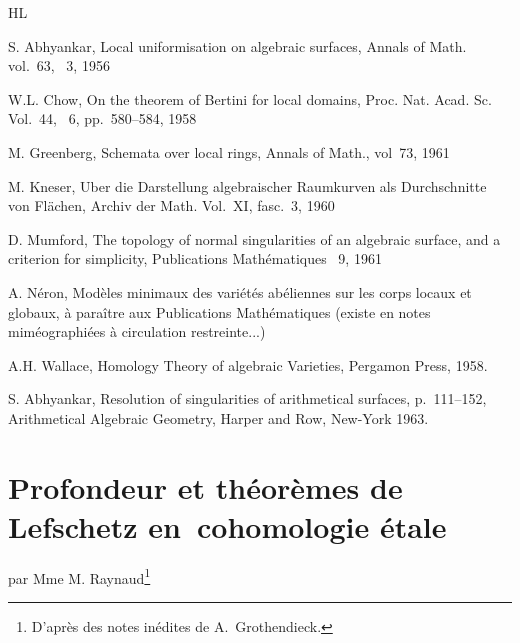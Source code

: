\begin{thebibliography}{HL}\label{XIII.7}

S. Abhyankar, Local uniformisation on algebraic surfaces, Annals of Math. vol.~63, \No~3, 1956

W.L. Chow, On the theorem of Bertini for local domains, Proc. Nat. Acad. Sc. Vol.~44, \No~6, pp.\, 580--584, 1958

M. Greenberg, Schemata over local rings, Annals of Math., vol~73, 1961

M. Kneser, Uber die Darstellung algebraischer Raumkurven als Durchschnitte von Fl\"achen, Archiv der Math. Vol.~XI, fasc.~3, 1960

D. Mumford, The topology of normal singularities of an algebraic surface, and a criterion for simplicity, Publications Math\'ematiques \No~9, 1961

A. N\'eron, Mod\`eles minimaux des vari\'et\'es ab\'eliennes sur les corps locaux et globaux, \`a para\^itre aux Publications Math\'ematiques (existe en notes mim\'eographi\'ees \`a circulation restreinte...)

A.H. Wallace, Homology Theory of algebraic Varieties, Pergamon Press, 1958.

S. Abhyankar, Resolution of singularities of arithmetical surfaces, p.\, 111--152, Arithmetical Algebraic Geometry, Harper and Row, New-York 1963.


\end{thebibliography}

\chapter[Profondeur et th\'eor\`emes de Lefschetz]
{Profondeur et th\'eor\`emes de Lefschetz en~cohomologie \'etale} \label{XIV}
\begin{center}
par Mme M. Raynaud\footnote{D'apr\`es des notes in\'edites de A.~Grothendieck.}
\end{center}

